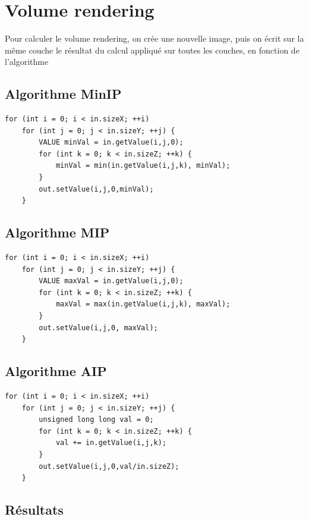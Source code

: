 \documentclass[a4paper,11pt]{article}
\begin{document}
\section{Volume rendering}
Pour calculer le volume rendering, on crée une nouvelle image, puis on écrit sur la même couche le résultat du calcul appliqué sur toutes les couches, en fonction de l'algorithme

\subsection{Algorithme MinIP}
\begin{lstlisting}
for (int i = 0; i < in.sizeX; ++i)
	for (int j = 0; j < in.sizeY; ++j) {
		VALUE minVal = in.getValue(i,j,0);
		for (int k = 0; k < in.sizeZ; ++k) {
			minVal = min(in.getValue(i,j,k), minVal);
		}
		out.setValue(i,j,0,minVal);
	}
\end{lstlisting}

\subsection{Algorithme MIP}
\begin{lstlisting}
for (int i = 0; i < in.sizeX; ++i)
	for (int j = 0; j < in.sizeY; ++j) {
		VALUE maxVal = in.getValue(i,j,0);
		for (int k = 0; k < in.sizeZ; ++k) {
			maxVal = max(in.getValue(i,j,k), maxVal);
		}
		out.setValue(i,j,0, maxVal);
	}
\end{lstlisting}

\subsection{Algorithme AIP}
\begin{lstlisting}
for (int i = 0; i < in.sizeX; ++i)
	for (int j = 0; j < in.sizeY; ++j) {
		unsigned long long val = 0;
		for (int k = 0; k < in.sizeZ; ++k) {
			val += in.getValue(i,j,k);
		}
		out.setValue(i,j,0,val/in.sizeZ);
	}
\end{lstlisting}

\subsection{Résultats}
\end{document}
